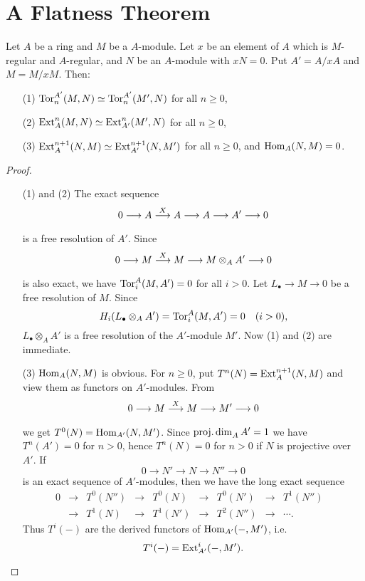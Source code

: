 \documentclass[../main]{subfiles}
\begin{document}
\section{A Flatness Theorem}\label{sec:36}

\begin{parlemma}
\label{lem:36.01}
Let $A$ be a ring and $M$ be a $A$-module. Let $x$ be an element of $A$ which is $M$-regular and $A$-regular, and $N$ be an $A$-module with $xN=0$. Put $A' = A/xA$ and $M = M/xM$. Then:
\begin{enumerate}
    \item[(1)] $\operatorname{Tor}^{A'}_n(M,N) \simeq \operatorname{Tor}^{A'}_n(M',N)$ for all $n\ge 0$,
    \item[(2)] $\operatorname{Ext}^n_A(M,N) \simeq \operatorname{Ext}^n_{A'} (M', N)$ for all $n\ge 0$,
    \item[(3)] $\operatorname{Ext}^{n+1}_A(N,M)\simeq \operatorname{Ext}^{n+1}_{A'}(N,M')$ for all $n\ge 0$, and $\operatorname{Hom}_A(N,M) = 0$.
\end{enumerate}
\end{parlemma}
\begin{proof}\phantom{,}
\begin{enumerate}
    \item[(1) and (2)] The exact sequence \[0\longrightarrow A\varrightarrow{X} A\longrightarrow A\longrightarrow A'\longrightarrow 0\] is a free resolution of $A'$. Since \[0\longrightarrow M\varrightarrow{X} M\longrightarrow M\otimes_A A'\longrightarrow 0\] is also exact, we have $\operatorname{Tor}^A_i(M,A')=0$ for all $i>0$. Let $L_\bullet\longrightarrow M \longrightarrow 0$ be a free resolution of $M$. Since \[H_i(L_\bullet\otimes_A A') = \Tor^A_i(M,A') = 0\for{i>0},\] $L_\bullet\otimes_A A'$ is a free resolution of the $A'$-module $M'$. Now (1) and (2) are immediate. 
    \item[(3)]$\operatorname{Hom}_A(N,M)$ is obvious. For $n\ge 0$, put $T^n(N) = \operatorname{Ext}^{n+1}_A(N,M)$ and view them as functors on $A'$-modules. From \[0\longrightarrow M\varrightarrow{X} M \longrightarrow M'\longrightarrow 0\] we get $T^0(N) = \operatorname{Hom}_{A'}(N,M')$. Since $\operatorname{proj. dim}_A A' = 1$ we have $T^n(A') = 0$ for $n>0$, hence $T^n(N) = 0$ for $n>0$ if $N$ is projective over $A'$. If \[0\longrightarrow N'\longrightarrow N\longrightarrow N'' \longrightarrow 0\] is an exact sequence of $A'$-modules, then we have the long exact sequence \[\begin{aligned}0&\longrightarrow& T^0(N'') &\longrightarrow& T^0(N)&\longrightarrow& T^0(N')&\longrightarrow& T^1(N'')&\\ &\longrightarrow& T^1(N)&\longrightarrow& T^1(N')&\longrightarrow& T^2(N'')&\longrightarrow& \cdots.&\end{aligned}\]
    Thus $T^i(-)$ are the derived functors of $\operatorname{Hom}_{A'} (-, M')$, i.e. \[T^i(-) = \operatorname{Ext}^i_{A'}(-,M').\]
\end{enumerate}

\end{proof}
\end{document}
